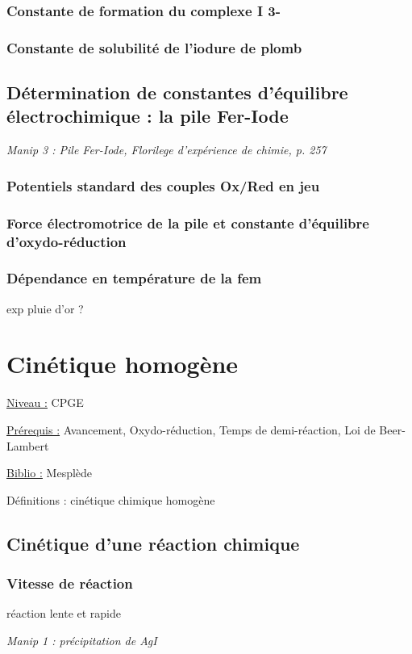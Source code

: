 \documentclass{article}%
\begin{document}
\subsubsection{Constante de formation du complexe I 3-}
\subsubsection{Constante de solubilité de l'iodure de plomb}
\subsection{Détermination de constantes d'équilibre électrochimique : la pile Fer-Iode}
\textit{Manip 3 : Pile Fer-Iode, Florilege d’expérience de chimie, p. 257}
\subsubsection{Potentiels standard des couples Ox/Red en jeu}
\subsubsection{Force électromotrice de la pile et constante d'équilibre d'oxydo-réduction}
\subsubsection{Dépendance en température de la fem}
exp pluie d'or ?

\section{Cinétique homogène}
\underline{Niveau :} CPGE 

\underline{Prérequis :} Avancement, Oxydo-réduction, Temps de demi-réaction, Loi de Beer-Lambert

\underline{Biblio :} Mesplède

Définitions : cinétique chimique
homogène

\subsection{Cinétique d'une réaction chimique}
\subsubsection{Vitesse de réaction}
réaction lente et rapide

\textit{Manip 1 : précipitation de AgI}
\end{document}

